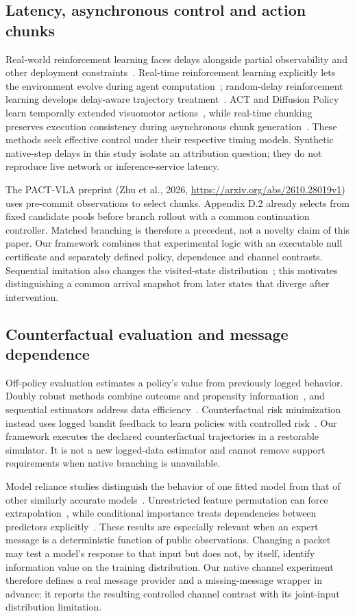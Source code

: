 \subsection{Latency, asynchronous control and action chunks}
Real-world reinforcement learning faces delays alongside partial observability and other deployment constraints~\cite{dulac}. Real-time reinforcement learning explicitly lets the environment evolve during agent computation~\cite{ramstedt}; random-delay reinforcement learning develops delay-aware trajectory treatment~\cite{randomdelay}. ACT and Diffusion Policy learn temporally extended visuomotor actions~\cite{act,diffusion}, while real-time chunking preserves execution consistency during asynchronous chunk generation~\cite{rtc}. These methods seek effective control under their respective timing models. Synthetic native-step delays in this study isolate an attribution question; they do not reproduce live network or inference-service latency.

The PACT-VLA preprint (Zhu et al., 2026, \url{https://arxiv.org/abs/2610.28019v1}) uses pre-commit observations to select chunks. Appendix D.2 already selects from fixed candidate pools before branch rollout with a common continuation controller. Matched branching is therefore a precedent, not a novelty claim of this paper. Our framework combines that experimental logic with an executable null certificate and separately defined policy, dependence and channel contrasts. Sequential imitation also changes the visited-state distribution~\cite{ross}; this motivates distinguishing a common arrival snapshot from later states that diverge after intervention.

\subsection{Counterfactual evaluation and message dependence}
Off-policy evaluation estimates a policy's value from previously logged behavior. Doubly robust methods combine outcome and propensity information~\cite{dudik,jiang}, and sequential estimators address data efficiency~\cite{thomas}. Counterfactual risk minimization instead uses logged bandit feedback to learn policies with controlled risk~\cite{swaminathan}. Our framework executes the declared counterfactual trajectories in a restorable simulator. It is not a new logged-data estimator and cannot remove support requirements when native branching is unavailable.

Model reliance studies distinguish the behavior of one fitted model from that of other similarly accurate models~\cite{fisher}. Unrestricted feature permutation can force extrapolation~\cite{hooker}, while conditional importance treats dependencies between predictors explicitly~\cite{strobl}. These results are especially relevant when an expert message is a deterministic function of public observations. Changing a packet may test a model's response to that input but does not, by itself, identify information value on the training distribution. Our native channel experiment therefore defines a real message provider and a missing-message wrapper in advance; it reports the resulting controlled channel contrast with its joint-input distribution limitation.

